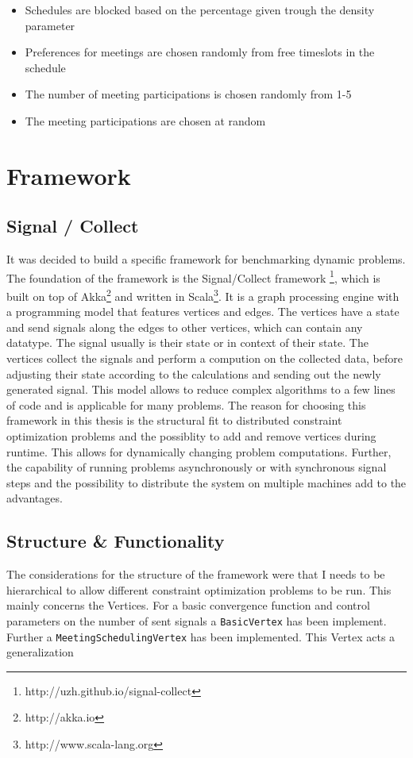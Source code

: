 \begin{itemize}
\item Schedules are blocked based on the percentage given trough the density parameter
\item Preferences for meetings are chosen randomly from free timeslots in the schedule
\item The number of meeting participations is chosen randomly from 1-5
\item The meeting participations are chosen at random
\end{itemize}

\section{Framework}

\subsection{Signal / Collect}

It was decided to build a specific framework for benchmarking dynamic problems. The foundation of the framework is the Signal/Collect framework \cite{Stutz2010}\footnote{http://uzh.github.io/signal-collect}, which is built on top of Akka\footnote{http://akka.io} and written in Scala\footnote{http://www.scala-lang.org}. It is a graph processing engine with a programming model that features vertices and edges. The vertices have a state and send signals along the edges to other vertices, which can contain any datatype. The signal usually is their state or in context of their state. The vertices collect the signals and perform a compution on the collected data, before adjusting their state according to the calculations and sending out the newly generated signal.  This model allows to reduce complex algorithms to a few lines of code and is applicable for many problems. The reason for choosing this framework in this thesis is the structural fit to distributed constraint optimization problems and the possiblity to add and remove vertices during runtime. This allows for dynamically changing problem computations. Further, the capability of running problems asynchronously or with synchronous signal steps and the possibility to distribute the system on multiple machines add to the advantages.

\subsection{Structure \& Functionality}
The considerations for the structure of the framework were that I needs to be hierarchical to allow different constraint optimization problems to be run. This mainly concerns the Vertices. For a basic convergence function and control parameters on the number of sent signals a \texttt{BasicVertex} has been implement. Further a \texttt{MeetingSchedulingVertex} has been implemented. This Vertex acts a generalization

